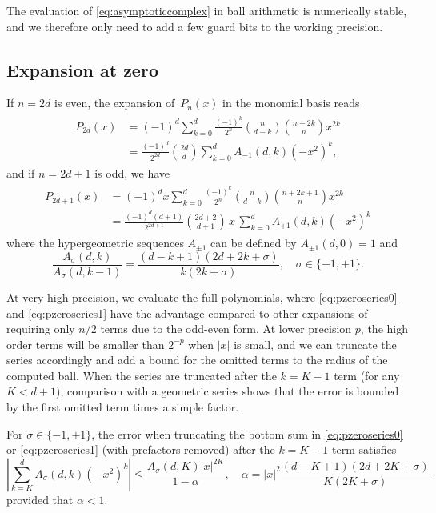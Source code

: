 \documentclass[nohypdvips,review]{siamart0216}
\begin{document}
The evaluation of \cref{eq:asymptoticcomplex} in ball arithmetic
is numerically stable, and we therefore only need to add a few
guard bits to the working precision.

\subsection{Expansion at zero}

\label{sec:series-zero}

If $n = 2d$ is even, the expansion of $P_n(x)$ in the monomial basis
reads
\begin{align}
\label{eq:pzeroseries0}
\begin{split}
P_{2d}(x) &= (-1)^d \sum_{k=0}^d \frac{(-1)^k}{2^n} {n \choose d-k} {n+2k \choose n} x^{2k} \\
&= \frac{(-1)^d}{2^{2d}} {2d \choose d} \sum_{k=0}^d A_{-1}(d,k) (-x^2)^k,
\end{split}
\end{align}
and if $n = 2d+1$ is odd, we have
\begin{align}
\label{eq:pzeroseries1}
\begin{split}
P_{2d+1}(x) &= (-1)^d x \sum_{k=0}^d \frac{(-1)^k}{2^n} {n \choose d-k} {n+2k+1 \choose n} x^{2k} \\
&= \frac{(-1)^d (d+1)}{2^{2d+1}} {2d+2 \choose d+1} \,x\, \sum_{k=0}^d A_{+1}(d,k) (-x^2)^k
\end{split}
\end{align}
where the hypergeometric sequences $A_{\pm1}$ can be defined by
$A_{\pm 1}(d,0) = 1$ and
\begin{equation}
\label{eq:pzerorec}
\frac{A_{\sigma}(d,k)}{A_{\sigma}(d,k-1)} = \frac{(d-k+1) (2d+2k+\sigma)}{k (2k+\sigma)}, \quad \sigma \in \{-1,+1\}.
\end{equation}

At very high precision, we evaluate the full polynomials,
where \cref{eq:pzeroseries0} and \cref{eq:pzeroseries1}
have the advantage compared to other expansions
of requiring only $n/2$ terms due to the odd-even form.
At lower precision $p$, the high order terms will be smaller than
$2^{-p}$ when $|x|$ is small, and we can truncate the series
accordingly and add a bound for the omitted terms
to the radius of the computed ball.
When the series are truncated after the $k = K - 1$ term
(for any $K < d + 1$), comparison with a geometric series
shows that the error is bounded by the first
omitted term times a simple factor.

\begin{proposition}
For $\sigma \in \{-1,+1\}$, the error when truncating
the bottom sum in
\cref{eq:pzeroseries0} or \cref{eq:pzeroseries1} (with prefactors removed)
after the $k = K - 1$ term satisfies
\begin{equation}
\label{eq:truncerr1}
\left| \sum_{k=K}^d A_{\sigma}(d,k) (-x^2)^k \right| \le \frac{A_{\sigma}(d,K) |x|^{2K}}{1-\alpha},
\quad\!\! \alpha = |x|^2 \frac{(d-K+1)(2d+2K+\sigma)}{K (2K+\sigma)}
\end{equation}
provided that $\alpha < 1$.
\end{proposition}
\end{document}

